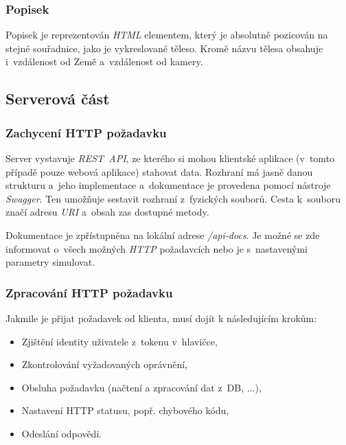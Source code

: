 \documentclass[a4paper,12pt]{article}
\begin{document}

\subsubsection{Popisek}

Popisek je reprezentován \textit{HTML} elementem, který je absolutně pozicován na stejné souřadnice, jako je vykreslované těleso. Kromě názvu tělesa obsahuje i~vzdálenost od Země a~vzdálenost od kamery.

\subsection{Serverová část}

\subsubsection{Zachycení HTTP požadavku}

Server vystavuje \textit{REST~API}, ze kterého si mohou klientské aplikace (v~tomto případě pouze webová aplikace) stahovat data. Rozhraní má jasně danou strukturu a~jeho implementace a~dokumentace je provedena pomocí nástroje \textit{Swagger}. Ten umožňuje sestavit rozhraní z~fyzických souborů. Cesta k~souboru značí adresu \textit{URI} a~obsah zas dostupné metody.



Dokumentace je zpřístupněna na lokální adrese \textit{/api-docs}. Je možné se zde informovat o~všech možných \textit{HTTP} požadavcích nebo je s~nastavenými parametry simulovat.

\subsubsection{Zpracování HTTP požadavku}

Jakmile je přijat požadavek od klienta, musí dojít k následujícím krokům:

\begin{itemize}
\item Zjištění identity uživatele z~tokenu v~hlavičce,
\item Zkontrolování vyžadovaných oprávnění,
\item Obsluha požadavku (načtení a zpracování dat z~DB, ...),
\item Nastavení HTTP statusu, popř. chybového kódu,
\item Odeslání odpovědi.
\end{itemize}
\end{document}
